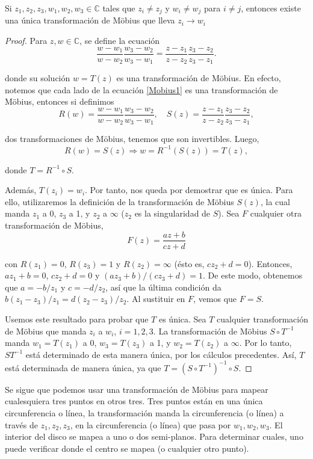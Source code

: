 \begin{propo}
Si $z_1, z_2, z_3, w_1, w_2, w_3 \in \mathbb{C}$ tales que $z_i \neq z_j$ y $w_i \neq w_j$ para $i \neq j$, entonces existe una única transformación de Möbius que lleva $z_i \to w_i$
\end{propo}

\begin{proof}
Para $z,w \in \mathbb{C}$, se define la ecuación
\begin{equation}
 \frac{w-w_1}{w-w_2} \frac{w_3-w_2}{w_3-w_1} = \frac{z-z_1}{z-z_2} \frac{z_3 - z_2}{z_3 - z_1}.  \label{Mobius1} 
\end{equation}

donde su solución $w = T(z)$  es una transformación de Möbius. En efecto, notemos que cada lado de la ecuación \eqref{Mobius1} es una transformación de Möbius, entonces si definimos
$$R(w) =  \frac{w-w_1}{w-w_2} \frac{w_3-w_2}{w_3-w_1}, \quad S(z) = \frac{z-z_1}{z-z_2} \frac{z_3 - z_2}{z_3 - z_1},$$

dos transformaciones de Möbius, tenemos que son invertibles. Luego,
$$R(w) = S(z) \Rightarrow w = R^{-1}(S(z)) = T(z),$$

donde $T = R^{-1} \circ S$.

Además, $T(z_i) = w_i$. Por tanto, nos queda por demostrar que es única. Para ello, utilizaremos la definición de la transformación de Möbius $S(z)$, la cual manda $z_1$ a 0, $z_3$ a 1, y $z_2$ a $\infty$ ($z_2$ es la singularidad de $S$). Sea $F$ cualquier otra transformación de Möbius,
$$F(z) = \frac{az + b}{cz + d}$$

con $R(z_1) = 0$, $R(z_3) = 1$ y $R(z_2) = \infty$ (ésto es, $c z_2 + d = 0$). Entonces, $az_1 + b = 0$, $c z_2 + d = 0$ y $(az_3 + b)/(cz_3+d) = 1$. De este modo, obtenemos que $a = -b/z_1$ y $c = -d/z_2$, así que la última condición da $b(z_1-z_3)/z_1 = d(z_2-z_3)/z_2$. Al sustituir en $F$, vemos que $F = S$.

Usemos este resultado para probar que $T$ es única. Sea $T$ cualquier transformación de Möbius que manda $z_i$ a $w_i$, $i = 1,2,3$. La transformación de Möbius $S\circ T^{-1}$ manda $w_1 = T(z_1)$ a 0, $w_3 = T(z_3)$ a 1, y $w_2 = T(z_2)$ a $\infty$. Por lo tanto, $ST^{-1}$ está determinado de esta manera única, por los cálculos precedentes. Así, $T$ está determinada de manera única, ya que $T = (S \circ T^{-1})^{-1} \circ S.$

\end{proof}

Se sigue que podemos usar una transformación de Möbius para mapear cualesquiera tres puntos en otros tres. Tres puntos están en una única circunferencia o línea, la transformación manda la circunferencia (o línea) a través de $z_1, z_2,z_3$, en la circunferencia (o línea) que pasa por $w_1, w_2, w_3$. El interior del disco se mapea a uno o dos semi-planos. Para determinar cuales, uno puede verificar donde el centro se mapea (o cualquier otro punto).


